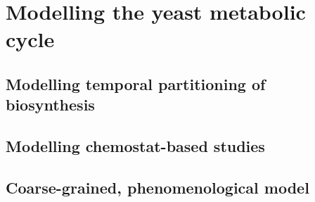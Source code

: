 \chapter{Modelling the yeast metabolic cycle}

\section{Modelling temporal partitioning of biosynthesis}

\section{Modelling chemostat-based studies}

\section{Coarse-grained, phenomenological model}
